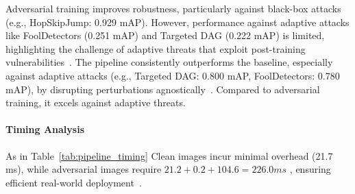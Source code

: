 \documentclass[conference]{IEEEtran}
\begin{document}
\begin{table}[H]
\centering
\footnotesize
\caption{Effectiveness of Adversarial Training and Dynamic Preprocessing Pipeline}
\label{tab:combined_results}
\end{table}
Adversarial training improves robustness, particularly against black-box attacks (e.g., HopSkipJump: 0.929 mAP). However, performance against adaptive attacks like FoolDetectors (0.251 mAP) and Targeted DAG (0.222 mAP) is limited, highlighting the challenge of adaptive threats that exploit post-training vulnerabilities~\cite{lu2017fooldetectors,xie2017DAG}.
The pipeline consistently outperforms the baseline, especially against adaptive attacks (e.g., Targeted DAG: 0.800 mAP, FoolDetectors: 0.780 mAP), by disrupting perturbations agnostically~\cite{das2017keepingbadguysout}. Compared to adversarial training, it excels against adaptive threats.

\paragraph{Timing Analysis}
As in Table~\ref{tab:pipeline_timing} Clean images incur minimal overhead (21.7 ms), while adversarial images require \(21.2+0.2+104.6=226.0 ms\) , ensuring efficient real-world deployment~\cite{cohen2019certified}.

\begin{table}[H]
\centering
\footnotesize
\caption{Pipeline Timing}
\label{tab:pipeline_timing}
\end{table}
\end{document}
